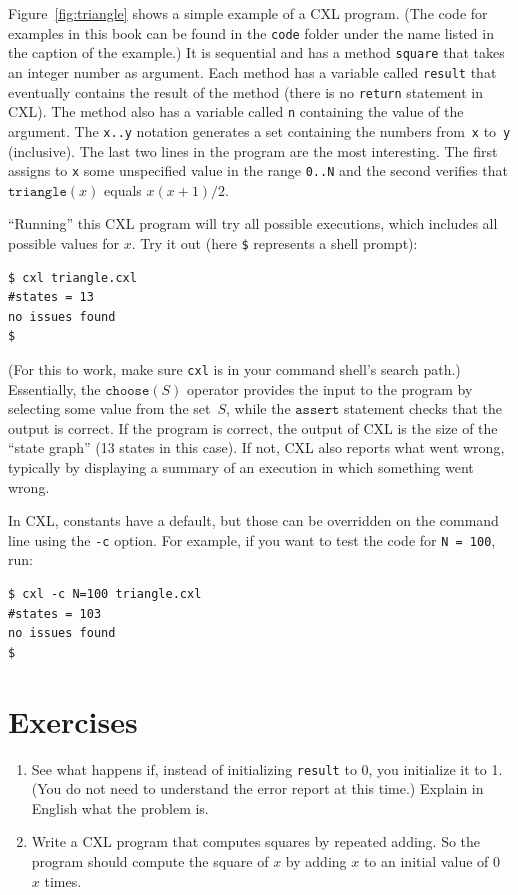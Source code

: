 \documentclass{report}
\newenvironment{code}{
\tcolorbox
}{
\endtcolorbox
}
\begin{document}
Figure~\ref{fig:triangle} shows a simple example of a CXL program.
(The code for examples in this book can be found in the \texttt{code} folder under
the name listed in the caption of the example.)
It is sequential and has a method \texttt{square} that takes
an integer number as argument.  Each method has a variable called
\texttt{result} that eventually contains the result of the
method (there is no \texttt{return} statement in CXL).  The method
also has a variable called \texttt{n} containing the value of the
argument.  The \texttt{x..y} notation generates a set containing the numbers
from~\texttt{x} to~\texttt{y} (inclusive).  The last two lines in the program are
the most interesting.
The first assigns to \texttt{x} some unspecified value in the range \texttt{0..N}
and the second verifies that $\mathtt{triangle}(x)$ equals $x(x+1)/2$.

``Running'' this CXL program will try all possible executions, which
includes all possible values for $x$.  Try it out (here \texttt{\$}
represents a shell prompt):

\begin{code}
\begin{verbatim}
$ cxl triangle.cxl
#states = 13
no issues found
$
\end{verbatim}
\end{code}

(For this to work, make sure \texttt{cxl} is in your command shell's search path.)
Essentially, the $\texttt{choose}(S)$
operator provides the input to the program by selecting some value from the
set~$S$, while the $\texttt{assert}$ statement checks that the output is
correct.  If the program is correct, the output of CXL is the size of the
``state graph'' (13 states in this case).  If not, CXL also
reports what went wrong, typically by displaying a summary of an execution in
which something went wrong.

In CXL, constants have a default, but those can be overridden on the command
line using the \texttt{-c} option.
For example, if you want to test the code for \texttt{N = 100}, run:
\begin{code}
\begin{verbatim}
$ cxl -c N=100 triangle.cxl
#states = 103
no issues found
$
\end{verbatim}
\end{code}

\section*{Exercises}
\begin{enumerate}
\item See what happens if, instead of initializing \texttt{result} to 0,
you initialize it to 1.  (You do not need to understand the error report at this time.)
Explain in English what the problem is.
\item Write a CXL program that computes squares by repeated adding.  So the program
should compute the square of $x$ by adding $x$ to an initial value of 0 $x$ times.
\end{enumerate}
\end{document}

